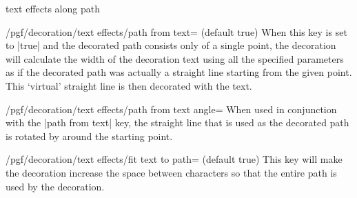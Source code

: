 \begin{decoration}{text effects along path}
    \begin{key}{/pgf/decoration/text effects/path from text= (default true)}
        When this key is set to |true| and the decorated path consists only of
        a single point, the decoration will calculate the width of the
        decoration text using all the specified parameters as if the decorated
        path was actually a straight line starting from the given point. This
        `virtual' straight line is then decorated with the text.
\begin{codeexample}[preamble={\usetikzlibrary{decorations.text}}]
\end{codeexample}
    \end{key}

    \begin{key}{/pgf/decoration/text effects/path from text angle=}
        When used in conjunction with the |path from text| key, the straight
        line that is used as the decorated path is rotated by 
        around the starting point.
\begin{codeexample}[preamble={\usetikzlibrary{decorations.text}}]
\end{codeexample}
    \end{key}

    \begin{key}{/pgf/decoration/text effects/fit text to path= (default true)}
        This key will make the decoration increase the space between characters
        so that the entire path is used by the decoration.
\begin{codeexample}[preamble={\usetikzlibrary{decorations.text}}]
\begin{tikzpicture}[decoration={text effects along path,
  text={text effects along path!},
  text effects/every character/.style={text along path}}]


\end{tikzpicture}
\end{codeexample}
\end{key}
\end{decoration}

